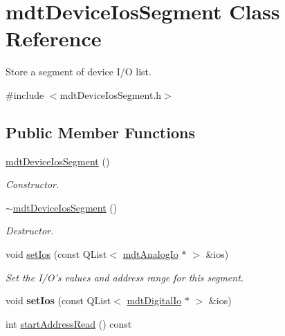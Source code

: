 \hypertarget{classmdt_device_ios_segment}{
\section{mdtDeviceIosSegment Class Reference}
\label{classmdt_device_ios_segment}
}


Store a segment of device I/O list.  




{\ttfamily \#include $<$mdtDeviceIosSegment.h$>$}

\subsection*{Public Member Functions}
\begin{DoxyCompactItemize}
\item 
\hyperlink{classmdt_device_ios_segment_a700a57dbaeedc6d75e4230cb1fedd65b}{mdtDeviceIosSegment} ()
\begin{DoxyCompactList}\small\item\em Constructor. \end{DoxyCompactList}\item 
\hypertarget{classmdt_device_ios_segment_a7310c0a5724f370716b0b7f1a4ad4e0a}{
\hyperlink{classmdt_device_ios_segment_a7310c0a5724f370716b0b7f1a4ad4e0a}{$\sim$mdtDeviceIosSegment} ()}
\label{classmdt_device_ios_segment_a7310c0a5724f370716b0b7f1a4ad4e0a}

\begin{DoxyCompactList}\small\item\em Destructor. \end{DoxyCompactList}\item 
void \hyperlink{classmdt_device_ios_segment_a0542a6bf1578390e8b646e5fbd238e24}{setIos} (const QList$<$ \hyperlink{classmdt_analog_io}{mdtAnalogIo} $\ast$ $>$ \&ios)
\begin{DoxyCompactList}\small\item\em Set the I/O's values and address range for this segment. \end{DoxyCompactList}\item 
\hypertarget{classmdt_device_ios_segment_ab2ad8b6cebc1f2b6a4ae3a2a4a87b592}{
void {\bfseries setIos} (const QList$<$ \hyperlink{classmdt_digital_io}{mdtDigitalIo} $\ast$ $>$ \&ios)}
\label{classmdt_device_ios_segment_ab2ad8b6cebc1f2b6a4ae3a2a4a87b592}

\item 
\hypertarget{classmdt_device_ios_segment_a91dba1936e6a50ac3833190a93901e9a}{
int \hyperlink{classmdt_device_ios_segment_a91dba1936e6a50ac3833190a93901e9a}{startAddressRead} () const }
\label{classmdt_device_ios_segment_a91dba1936e6a50ac3833190a93901e9a}


\end{DoxyCompactItemize}
